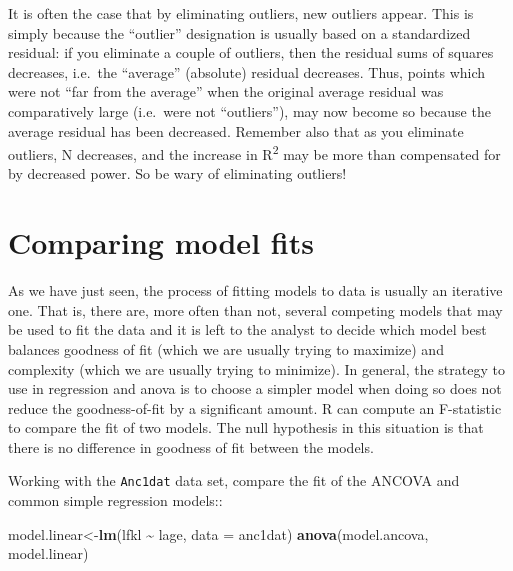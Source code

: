 \documentclass[
  12pt,
]{book}
\makeatletter
\newenvironment{Shaded}{\begin{snugshade}}{\end{snugshade}}
\newcommand{\DataTypeTok}[1]{\textcolor[rgb]{0.13,0.29,0.53}{#1}}
\newcommand{\KeywordTok}[1]{\textcolor[rgb]{0.13,0.29,0.53}{\textbf{#1}}}
\newcommand{\NormalTok}[1]{#1}
\newcommand{\OperatorTok}[1]{\textcolor[rgb]{0.81,0.36,0.00}{\textbf{#1}}}
\newcommand{\StringTok}[1]{\textcolor[rgb]{0.31,0.60,0.02}{#1}}
\newenvironment{kframe}{%
\medskip{}
\setlength{\fboxsep}{.8em}
\def\at@end@of@kframe{}%
\ifinner\ifhmode%
 \def\at@end@of@kframe{\end{minipage}}%
 \begin{minipage}{\columnwidth}%
\fi\fi%
\def\FrameCommand##1{\hskip\@totalleftmargin \hskip-\fboxsep
\colorbox{incolor}{##1}\hskip-\fboxsep
    \hskip-\linewidth \hskip-\@totalleftmargin \hskip\columnwidth}%
\MakeFramed {\advance\hsize-\width
  \@totalleftmargin\z@ \linewidth\hsize
  \@setminipage}}%
{\par\unskip\endMakeFramed%
\at@end@of@kframe}
\newenvironment{rmdblock}[1]
 {
 \begin{itemize}
 \renewcommand{\labelitemi}{
   \raisebox{-.7\height}[0pt][0pt]{
     {\setkeys{Gin}{width=3em,keepaspectratio}\texttt{[image: images/\#1]}}
   }
 }
 \begin{kframe}
 \setlength{\fboxsep}{1em}
 \item
 }
 {
 \end{kframe}
 \end{itemize}
 }
\newenvironment{rmdnote}
  {\begin{rmdblock}{note}}
  {\end{rmdblock}}
\newenvironment{rmdcode}
  {\begin{rmdblock}{screen}}
  {\end{rmdblock}}
\makeatother
\begin{document}
\begin{rmdnote}
It is often the case that by eliminating outliers, new outliers appear. This is simply because the ``outlier'' designation is usually based on a standardized residual: if you eliminate a couple of outliers, then the residual sums of squares decreases, i.e.~the ``average'' (absolute) residual decreases. Thus, points which were not ``far from the average'' when the original average residual was comparatively large (i.e.~were not ``outliers''), may now become so because the average residual has been decreased. Remember also that as you eliminate outliers, N decreases, and the increase in R\textsuperscript{2} may be more than compensated for by decreased power. So be wary of eliminating outliers!
\end{rmdnote}

\hypertarget{comparing-model-fits}{%
\section{Comparing model fits}\label{comparing-model-fits}}

As we have just seen, the process of fitting models to data is usually an iterative one. That is, there are, more often than not, several competing models that may be used to fit the data and it is left to the analyst to decide which model best balances goodness of fit (which we are usually trying to maximize) and complexity (which we are usually trying to minimize). In general, the strategy to use in regression and anova is to choose a simpler model when doing so does not reduce the goodness-of-fit by a significant amount. R can compute an F-statistic to compare the fit of two models. The null hypothesis in this situation is that there is no difference in goodness of fit between the models.

\begin{rmdcode}
Working with the \texttt{Anc1dat} data set, compare the fit of the ANCOVA and common simple regression models::
\end{rmdcode}

\begin{Shaded}
\begin{Highlighting}[]
\NormalTok{model.linear\textless{}{-}}\KeywordTok{lm}\NormalTok{(lfkl }\OperatorTok{\textasciitilde{}}\StringTok{ }\NormalTok{lage, }\DataTypeTok{data =}\NormalTok{ anc1dat)}
\KeywordTok{anova}\NormalTok{(model.ancova, model.linear)}
\end{Highlighting}
\end{Shaded}
\end{document}
